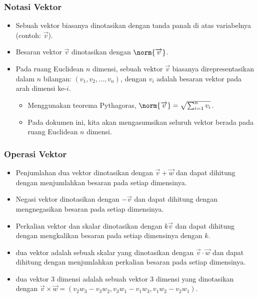 \begin{frame}
\frametitle{Notasi Vektor}
\begin{itemize}
  \item Sebuah vektor biasanya dinotasikan dengan tanda panah di atas variabelnya (contoh: $\overrightarrow{v}$).
  \item Besaran vektor $\overrightarrow{v}$ dinotasikan dengan $\norm{\overrightarrow{v}}$.
  \item Pada ruang Euclidean $n$ dimensi, sebuah vektor $\overrightarrow{v}$ biasanya direpresentasikan dalam $n$ bilangan: $(v_1, v_2, \dots, v_n)$, dengan $v_i$ adalah besaran vektor pada arah dimensi ke-$i$.
  \begin{itemize}
    \item Menggunakan teorema Pythagoras, $\norm{\overrightarrow{v}} = \sqrt{\sum_{i=1}^{n} v_i}$.
    \item Pada dokumen ini, kita akan mengasumsikan seluruh vektor berada pada ruang Euclidean $n$ dimensi.
  \end{itemize}
\end{itemize}
\end{frame}

\begin{frame}
\frametitle{Operasi Vektor}
\begin{itemize}
  \item Penjumlahan dua vektor dinotasikan dengan $\overrightarrow{v} + \overrightarrow{w}$ dan dapat dihitung dengan menjumlahkan besaran pada setiap dimensinya.
  \item Negasi vektor dinotasikan dengan $-\overrightarrow{v}$ dan dapat dihitung dengan mengnegasikan besaran pada setiap dimensinya.
  \item Perkalian vektor dan skalar dinotasikan dengan $k\overrightarrow{v}$ dan dapat dihitung dengan mengkalikan besaran pada setiap dimensinya dengan $k$.
  \item {} dua vektor adalah sebuah skalar yang dinotasikan dengan $\overrightarrow{v} \cdot \overrightarrow{w}$ dan dapat dihitung dengan menjumlahkan perkalian besaran pada setiap dimensinya.
  \item {} dua vektor 3 dimensi adalah sebuah vektor 3 dimensi yang dinotasikan dengan $\overrightarrow{v} \times \overrightarrow{w} = (v_2w_3 - v_3w_2, v_3w_1 - v_1w_3, v_1w_2 - v_2w_1)$.
\end{itemize}
\end{frame}

